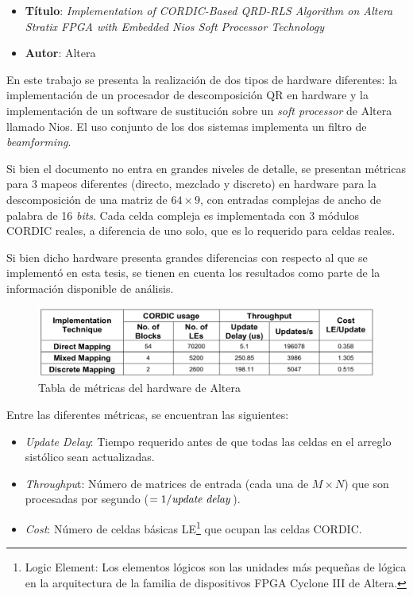 \begin{itemize}
\item[] \textbf{Título}: \textit{Implementation of CORDIC-Based QRD-RLS Algorithm on Altera Stratix FPGA with Embedded Nios Soft Processor Technology}
\item[] \textbf{Autor}: Altera
\end{itemize}

En este trabajo \cite{AlteraQR} se presenta la realización de dos tipos de hardware diferentes: la implementación de un procesador de descomposición QR en hardware y la implementación de un software de sustitución sobre un \textit{soft processor} de Altera llamado Nios. El uso conjunto de los dos sistemas implementa un filtro de \textit{beamforming}.

Si bien el documento no entra en grandes niveles de detalle, se presentan métricas para 3 mapeos diferentes (directo, mezclado y discreto) en hardware para la descomposición de una matriz de $64 \times 9$, con entradas complejas de ancho de palabra de 16 \textit{bits}. Cada celda compleja es implementada con 3 módulos CORDIC reales, a diferencia de uno solo, que es lo requerido para celdas reales.

Si bien dicho hardware presenta grandes diferencias con respecto al que se implementó en esta tesis, se tienen en cuenta los resultados como parte de la información disponible de análisis.

\begin{figure}[h!]
     \centering
     \includegraphics[width=12cm]{./figures/C03-altera_table}
     \caption{Tabla de métricas del hardware de Altera}
     \label{fig:altera_table}
\end{figure}

Entre las diferentes métricas, se encuentran las siguientes:

\begin{itemize}
\item[] \textit{Update Delay}: Tiempo requerido antes de que todas las celdas en el arreglo sistólico sean actualizadas.
\item[] \textit{Throughpu}t: Número de matrices de entrada (cada una de $M \times N$) que son procesadas por segundo ($= 1/\text{\textit{update delay}}$).
\item[] \textit{Cost}: Número de celdas básicas LE\footnote{\label{LE}Logic Element: Los elementos lógicos son las unidades más pequeñas de lógica en la arquitectura de la familia de dispositivos FPGA Cyclone III de Altera.} que ocupan las celdas CORDIC.
\end{itemize}

